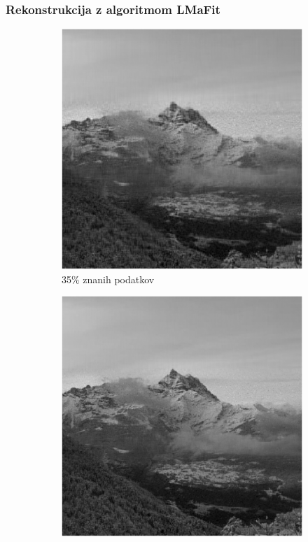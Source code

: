 \documentclass{beamer}
\begin{document}
\begin{frame}
  \frametitle{Rekonstrukcija z algoritmom LMaFit}
  \begin{figure}
    \begin{subfigure}{0.325\linewidth}
      \includegraphics[width=\linewidth]{slike/gora/slikaRez35LmaFIT50.png}
      \caption{35\% znanih podatkov}
    \end{subfigure}
    \begin{subfigure}{0.325\linewidth}
      \includegraphics[width=\linewidth]{slike/gora/slikaRez45LmaFIT73.png}

\end{subfigure}
\end{figure}
\end{frame}
\end{document}
